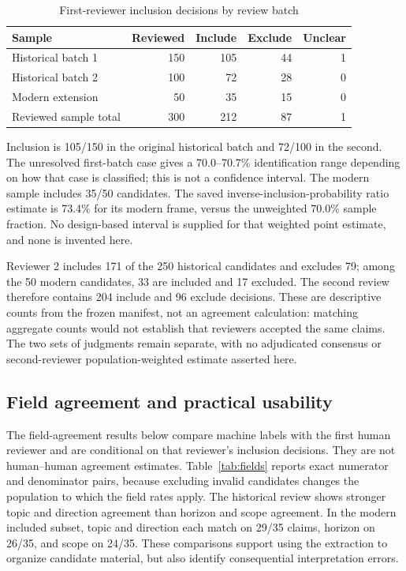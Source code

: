 \begin{table}[t]
\caption{First-reviewer inclusion decisions by review batch}\label{tab:review}
\centering\small
\begin{tabularx}{\linewidth}{Xrrrr}
\toprule
Sample & Reviewed & Include & Exclude & Unclear\\
\midrule
Historical batch 1 & 150 & 105 & 44 & 1\\
Historical batch 2 & 100 & 72 & 28 & 0\\
Modern extension & 50 & 35 & 15 & 0\\
\midrule
Reviewed sample total & 300 & 212 & 87 & 1\\
\bottomrule
\end{tabularx}
\end{table}

Inclusion is 105/150 in the original historical batch and 72/100 in the second. The unresolved first-batch case gives a 70.0--70.7\% identification range depending on how that case is classified; this is not a confidence interval. The modern sample includes 35/50 candidates. The saved inverse-inclusion-probability ratio estimate is 73.4\% for its modern frame, versus the unweighted 70.0\% sample fraction. No design-based interval is supplied for that weighted point estimate, and none is invented here.

Reviewer 2 includes 171 of the 250 historical candidates and excludes 79; among the 50 modern candidates, 33 are included and 17 excluded. The second review therefore contains 204 include and 96 exclude decisions. These are descriptive counts from the frozen manifest, not an agreement calculation: matching aggregate counts would not establish that reviewers accepted the same claims. The two sets of judgments remain separate, with no adjudicated consensus or second-reviewer population-weighted estimate asserted here.

\subsection{Field agreement and practical usability}
The field-agreement results below compare machine labels with the first human reviewer and are conditional on that reviewer's inclusion decisions. They are not human--human agreement estimates. Table~\ref{tab:fields} reports exact numerator and denominator pairs, because excluding invalid candidates changes the population to which the field rates apply. The historical review shows stronger topic and direction agreement than horizon and scope agreement. In the modern included subset, topic and direction each match on 29/35 claims, horizon on 26/35, and scope on 24/35. These comparisons support using the extraction to organize candidate material, but also identify consequential interpretation errors.

